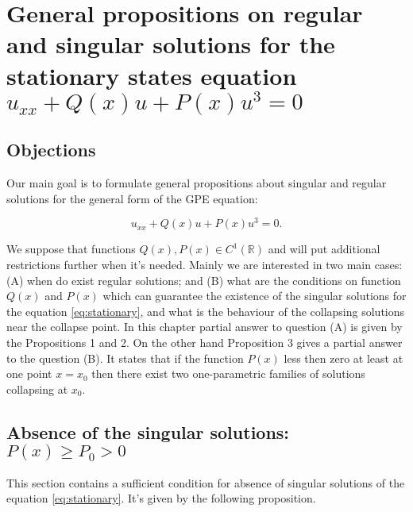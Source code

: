 \chapter{General propositions on regular and singular solutions for the stationary states equation $u_{xx} + Q(x) u + P(x) u^3 = 0$}

\section{Objections}

Our main goal is to formulate general propositions about singular  and regular solutions for the general form of the GPE equation:

\begin{equation}
	u_{xx} + Q(x) u + P(x) u^3 = 0.
	\label{eq:stationary}
\end{equation}

We suppose that functions $Q(x), P(x) \in C^1(\mathbb{R})$ and will put additional restrictions further when it's needed.
Mainly we are interested in two main cases: (A) when do exist regular solutions; and (B) what are the conditions on function $Q(x)$ and $P(x)$ which can guarantee the existence of the singular solutions for the equation \eqref{eq:stationary}, and what is the behaviour of the collapsing solutions near the collapse point.
In this chapter partial answer to question (A) is given by the Propositions 1 and 2.
On the other hand Proposition 3 gives a partial answer to the question (B).
It states that if the function $P(x)$ less then zero at least at one point $x = x_0$ then there exist two one-parametric families of solutions collapsing at $x_0$.

\section{Absence of the singular solutions: $P(x) \ge P_0 > 0$}

This section contains a sufficient condition for absence of singular solutions of the equation \eqref{eq:stationary}.
It's given by the following proposition.

